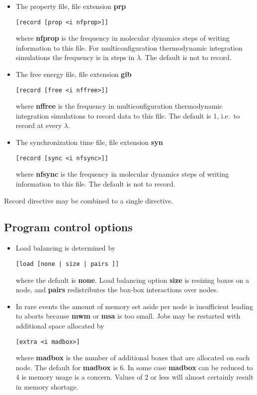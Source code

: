 \begin{itemize}
thermodynamic integration simulations the frequency is in
steps in $\lambda$. The default is not to record.
\item
The property file, file extension {\bf prp}
\begin{verbatim}
[record [prop <i nfprop>]]
\end{verbatim}
where {\bf nfprop} is the frequency in molecular dynamics steps
of writing information to this file. For multiconfiguration
thermodynamic integration simulations the frequency is in
steps in $\lambda$. The default is not to record.
\item
The free energy file, file extension {\bf gib}
\begin{verbatim}
[record [free <i nffree>]]
\end{verbatim}
where {\bf nffree} is the frequency in multiconfiguration
thermodynamic integration simulations to record data to this file.
The default is 1, i.e.\ to record at every $\lambda$.
\item
The synchronization time file, file extension {\bf syn}
\begin{verbatim}
[record [sync <i nfsync>]]
\end{verbatim}
where {\bf nfsync} is the frequency in molecular dynamics steps
of writing information to this file. The default is not to record.
\end{itemize}
Record directive may be combined to a single directive.
\subsection{Program control options}
\begin{itemize}
\item
Load balancing is determined by
\begin{verbatim}
[load [none | size | pairs ]]
\end{verbatim}
where the default is {\bf none}. Load balancing option {\bf size}
is resizing boxes on a node, and {\bf pairs} redistributes the
box-box interactions over nodes.
\item
In rare events the amount of memory set aside per node is insufficient
leading to aborts because {\bf mwm} or {\bf msa} is too small. Jobs
may be restarted with additional space allocated by
\begin{verbatim}
[extra <i madbox>]
\end{verbatim}
where {\bf madbox} is the number of additional boxes that are allocated
on each node. The default for {\bf madbox} is 6. In some case {\bf madbox}
can be reduced to 4 is memory usage is a concern. Values of 2 or less
will almost certainly result in memory shortage.
\end{itemize}
